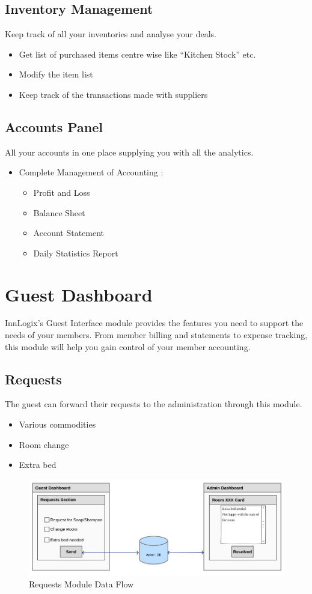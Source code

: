 \documentclass{scrreprt}
\begin{document}
\subsection{Inventory Management}
Keep track of all your inventories and analyse your deals.
\begin{itemize}
\item Get list of purchased items centre wise like “Kitchen Stock” etc.
\item Modify the item list
\item Keep track of the transactions made with suppliers
\end{itemize}

\subsection{Accounts Panel}
All your accounts in one place supplying you with all the analytics.
\begin{itemize}
    \item Complete Management of Accounting :
\begin{itemize}
    \item Profit and Loss
    \item Balance Sheet
    \item Account Statement
    \item Daily Statistics Report
\end{itemize}
\end{itemize}

\section{Guest Dashboard}
InnLogix’s Guest Interface module provides the features you need to support the needs of your members. From member billing and statements to expense tracking, this module will help you gain control of your member accounting.

\subsection{Requests}
The guest can forward their requests to the administration through this module.
\begin{itemize}
\item Various commodities
\item Room change
\item Extra bed
\end{itemize}
\begin{figure}
\includegraphics[scale=0.45]{requests}
\caption{Requests Module Data Flow}
\end{figure}
\end{document}
